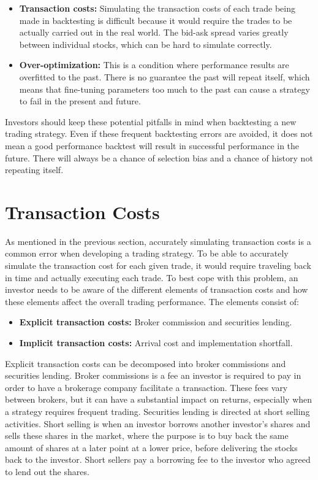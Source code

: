 \begin{itemize}
\item \textbf{Transaction costs:} Simulating the transaction costs of each trade being made in backtesting is difficult because it would require the trades to be actually carried out in the real world. The bid-ask spread varies greatly between individual stocks, which can be hard to simulate correctly.        
\item \textbf{Over-optimization:} This is a condition where performance results are overfitted to the past. There is no guarantee the past will repeat itself, which means that fine-tuning parameters too much to the past can cause a strategy to fail in the present and future.    
\end{itemize}

\indent\newline   
Investors should keep these potential pitfalls in mind when backtesting a new trading strategy. Even if these frequent backtesting errors are avoided, it does not mean a good performance backtest will result in successful performance in the future. There will always be a chance of selection bias and a chance of history not repeating itself.   

\section{Transaction Costs}
As mentioned in the previous section, accurately simulating transaction costs is a common error when developing a trading strategy. To be able to accurately simulate the transaction cost for each given trade, it would require traveling back in time and actually executing each trade. To best cope with this problem, an investor needs to be aware of the different elements of transaction costs and how these elements affect the overall trading performance. The elements consist of:

\begin{itemize}
\item \textbf{Explicit transaction costs:} Broker commission and securities lending.
\item \textbf{Implicit transaction costs:} Arrival cost and implementation shortfall.
\end{itemize}  
\cite{morgan}

\indent\newline   
Explicit transaction costs can be decomposed into broker commissions and securities lending. Broker commissions is a fee an investor is required to pay in order to have a brokerage company facilitate a transaction. These fees vary between brokers, but it can have a substantial impact on returns, especially when a strategy requires frequent trading. Securities lending is directed at short selling activities. Short selling is when an investor borrows another investor's shares and sells these shares in the market, where the purpose is to buy back the same amount of shares at a later point at a lower price, before delivering the stocks back to the investor. Short sellers pay a borrowing fee to the investor who agreed to lend out the shares. 

